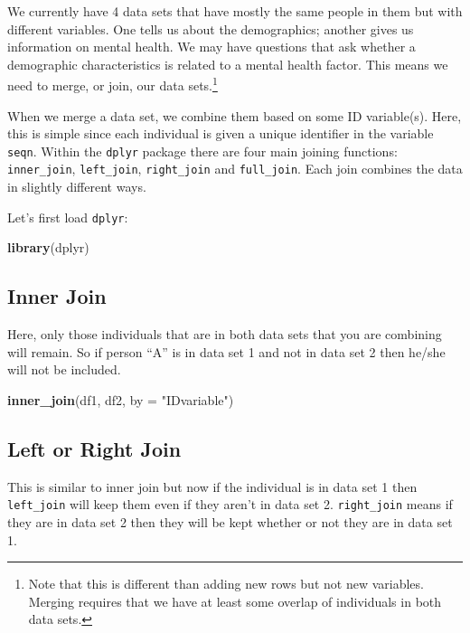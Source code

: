 \documentclass[]{tufte-book}
\newenvironment{Shaded}{}{}
\newcommand{\KeywordTok}[1]{\textcolor[rgb]{0.00,0.44,0.13}{\textbf{#1}}}
\newcommand{\DataTypeTok}[1]{\textcolor[rgb]{0.56,0.13,0.00}{#1}}
\newcommand{\StringTok}[1]{\textcolor[rgb]{0.25,0.44,0.63}{#1}}
\newcommand{\NormalTok}[1]{#1}
\theoremstyle{definition}
\theoremstyle{definition}
\theoremstyle{remark}
\begin{document}
We currently have 4 data sets that have mostly the same people in them
but with different variables. One tells us about the demographics;
another gives us information on mental health. We may have questions
that ask whether a demographic characteristics is related to a mental
health factor. This means we need to merge, or join, our data
sets.\footnote{Note that this is different than adding new rows but not
  new variables. Merging requires that we have at least some overlap of
  individuals in both data sets.}

When we merge a data set, we combine them based on some ID variable(s).
Here, this is simple since each individual is given a unique identifier
in the variable \texttt{seqn}. Within the \texttt{dplyr} package there
are four main joining functions: \texttt{inner\_join},
\texttt{left\_join}, \texttt{right\_join} and \texttt{full\_join}. Each
join combines the data in slightly different ways.

Let's first load \texttt{dplyr}:

\begin{Shaded}
\begin{Highlighting}[]
\KeywordTok{library}\NormalTok{(dplyr)}
\end{Highlighting}
\end{Shaded}

\subsection*{Inner Join}\label{inner-join}

Here, only those individuals that are in both data sets that you are
combining will remain. So if person ``A'' is in data set 1 and not in
data set 2 then he/she will not be included.

\begin{Shaded}
\begin{Highlighting}[]
\KeywordTok{inner_join}\NormalTok{(df1, df2, }\DataTypeTok{by =} \StringTok{"IDvariable"}\NormalTok{)}
\end{Highlighting}
\end{Shaded}

\subsection*{Left or Right Join}\label{left-or-right-join}

This is similar to inner join but now if the individual is in data set 1
then \texttt{left\_join} will keep them even if they aren't in data set
2. \texttt{right\_join} means if they are in data set 2 then they will
be kept whether or not they are in data set 1.
\end{document}
